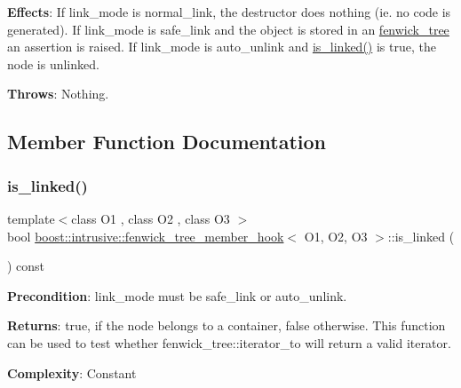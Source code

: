 {\bfseries Effects}\+: If link\+\_\+mode is {\ttfamily normal\+\_\+link}, the destructor does nothing (ie. no code is generated). If link\+\_\+mode is {\ttfamily safe\+\_\+link} and the object is stored in an \hyperlink{classboost_1_1intrusive_1_1fenwick__tree}{fenwick\+\_\+tree} an assertion is raised. If link\+\_\+mode is {\ttfamily auto\+\_\+unlink} and {\ttfamily \hyperlink{classboost_1_1intrusive_1_1fenwick__tree__member__hook_a3d23f59a0cf4e9d4e04b5e520912f47a}{is\+\_\+linked()}} is true, the node is unlinked.

{\bfseries Throws}\+: Nothing. 

\subsection{Member Function Documentation}
\mbox{\label{classboost_1_1intrusive_1_1fenwick__tree__member__hook_a3d23f59a0cf4e9d4e04b5e520912f47a}} 
\subsubsection{\texorpdfstring{is\+\_\+linked()}{is\_linked()}}
{\footnotesize\ttfamily template$<$class O1 , class O2 , class O3 $>$ \\
bool \hyperlink{classboost_1_1intrusive_1_1fenwick__tree__member__hook}{boost\+::intrusive\+::fenwick\+\_\+tree\+\_\+member\+\_\+hook}$<$ O1, O2, O3 $>$\+::is\+\_\+linked (\begin{DoxyParamCaption}{ }\end{DoxyParamCaption}) const}

{\bfseries Precondition}\+: link\+\_\+mode must be {\ttfamily safe\+\_\+link} or {\ttfamily auto\+\_\+unlink}.

{\bfseries Returns}\+: true, if the node belongs to a container, false otherwise. This function can be used to test whether {\ttfamily fenwick\+\_\+tree\+::iterator\+\_\+to} will return a valid iterator.

{\bfseries Complexity}\+: Constant \mbox{\label{classboost_1_1intrusive_1_1fenwick__tree__member__hook_ab810e0f0d6058c6bf8b679003b097b71}} 
